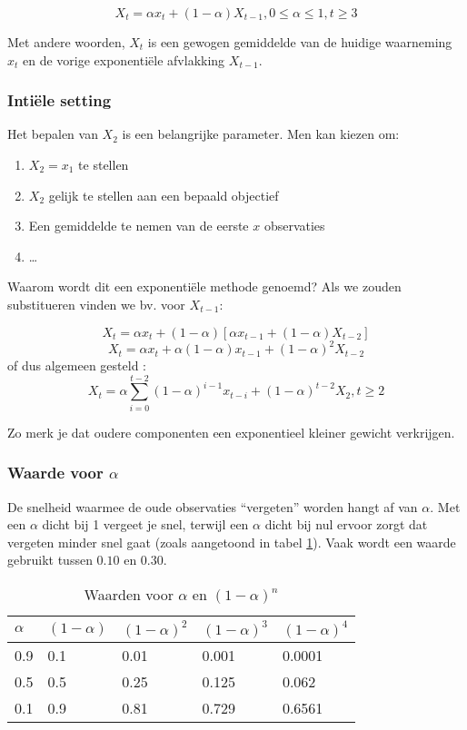 \begin{definition}
\begin{equation}
	X_{t} = \alpha x_{t} + (1-\alpha)X_{t-1}, 0 \leq \alpha \leq 1, t \geq 3
\label{eq:singleExpSmooting}
\end{equation}
\end{definition}

Met andere woorden, $X_{t}$ is een gewogen gemiddelde van de huidige waarneming $x_t$ en de vorige exponentiële afvlakking $X_{t-1}$.

\subsubsection{Intiële setting}
Het bepalen van $X_{2}$ is een belangrijke parameter. Men kan kiezen om:
\begin{enumerate}
	\item $X_{2} = x_{1}$ te stellen
	\item $X_{2}$ gelijk te stellen aan een bepaald objectief
	\item Een gemiddelde te nemen van de eerste $x$ observaties
	\item \dots
\end{enumerate}

Waarom wordt dit een exponentiële methode genoemd? Als we zouden substitueren vinden we bv. voor $X_{t-1}$:

\[ X_{t} = \alpha x_{t} + (1-\alpha)\left[\alpha x_{t-1} + (1-\alpha)X_{t-2}\right] \] 
\[ X_{t} = \alpha x_{t} + \alpha (1-\alpha)x_{t-1} + (1-\alpha)^{2} X_{t-2} \]
of dus algemeen gesteld :
\[ X_{t} = \alpha \sum_{i=0}^{t-2}(1-\alpha)^{i-1}x_{t-i} + (1-\alpha)^{t-2} X_{2}, t \geq 2 \]

Zo merk je dat oudere componenten een exponentieel kleiner gewicht verkrijgen. 

\subsubsection{Waarde voor $\alpha$}
De snelheid waarmee de oude observaties ``vergeten'' worden hangt af van $\alpha$. Met een $\alpha$ dicht bij 1 vergeet je snel, terwijl een $\alpha$ dicht bij nul ervoor zorgt dat vergeten minder snel gaat (zoals aangetoond in tabel \ref{tab:alpha}). Vaak wordt een waarde gebruikt tussen $0.10$ en $0.30$.

\begin{table}
\centering
    \begin{tabular}{l|llll}
    $\alpha$ & $(1-\alpha)$ & $(1-\alpha)^{2}$ & $(1-\alpha)^{3}$ & $(1-\alpha)^{4}$ \\ \hline
    0.9   & 0.1       & 0.01             & 0.001                      & 0.0001           \\
    0.5   & 0.5       & 0.25             & 0.125                      & 0.062            \\
    0.1   & 0.9       & 0.81             & 0.729                      & 0.6561           \\
    \end{tabular}
		\caption{Waarden voor $\alpha$ en $(1-\alpha)^{n}$}
		\label{tab:alpha}
\end{table}

